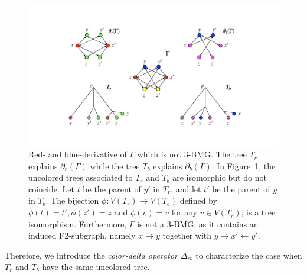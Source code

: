\documentclass[final,3p,times]{elsarticle}
\newtheorem{example}{Example}[section]
\begin{document}
\begin{figure}[ht]
  \centering
    \includegraphics[width=16cm]{figures/different_trees.png}
    \caption{Red- and blue-derivative of $\Gamma$ which is not 3-BMG. The tree $T_r$ explains $\partial_r(\Gamma)$ while the tree $T_b$ explains $\partial_b(\Gamma)$.
    	In Figure~\ref{fig:different_trees}, the uncolored trees associated to
    	$T_r$ and $T_b$ are isomorphic but do not coincide. Let $t$ be the
    	parent of $y'$ in $T_r$, and let $t'$ be the parent of $y$ in $T_b$. The
    	bijection $\phi:V(T_r)\rightarrow V(T_b)$ defined by
    	$\phi(t)=t',\phi(z')=z$ and $\phi(v)=v$ for any $v\in V(T_r)$, is a tree
    	isomorphism. Furthermore, $\Gamma$ is not a 3-BMG, as it contains an
    	induced F2-subgraph, namely $x\rightarrow y$ together with $y\rightarrow
    	x'\leftarrow y'$. }
    \label{fig:different_trees}
\end{figure}


Therefore, we introduce the \emph{color-delta operator} $\Delta_{rb}$ to characterize the case when $T_r$ and $T_b$ have the same uncolored tree.
\end{document}
